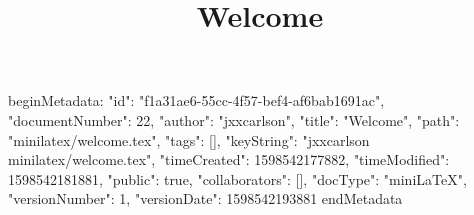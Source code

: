 beginMetadata:
{
    "id": "f1a31ae6-55cc-4f57-bef4-af6bab1691ac",
    "documentNumber": 22,
    "author": "jxxcarlson",
    "title": "Welcome",
    "path": "minilatex/welcome.tex",
    "tags": [],
    "keyString": "jxxcarlson minilatex/welcome.tex",
    "timeCreated": 1598542177882,
    "timeModified": 1598542181881,
    "public": true,
    "collaborators": [],
    "docType": "miniLaTeX",
    "versionNumber": 1,
    "versionDate": 1598542193881
}
endMetadata
\title{Welcome}

\maketitle



